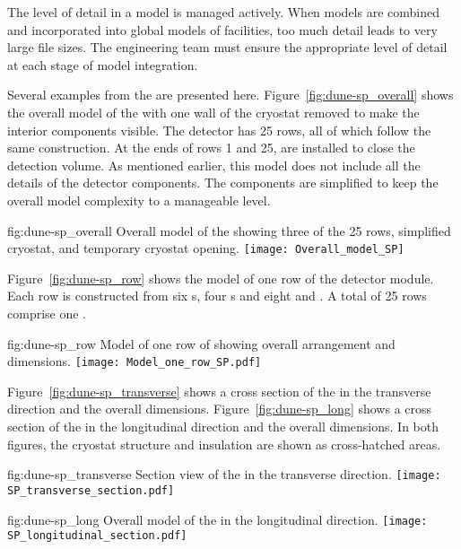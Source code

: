 The level of detail in a model is managed actively. When models are
combined and incorporated into global models of facilities, too much
detail leads to very large file sizes.  The  
engineering team must ensure the appropriate level of detail at each
stage of model integration.


Several examples from the  are presented
here. Figure~\ref{fig:dune-sp_overall} shows the overall model of the
 with one wall of the cryostat removed to make the
interior components visible. The detector has 25 rows, all of which
follow the same construction. At the ends of rows 1 and 25,
 are installed to close the detection volume.  As mentioned
earlier, this model does not include all the details of the detector
components. The components are simplified to keep the overall model
complexity to a manageable level.
\begin{dunefigure}{fig:dune-sp_overall}
  {Overall model of the  showing three of the 25 rows,
    simplified cryostat,  and temporary cryostat opening.}
  \texttt{[image: Overall\_model\_SP]}
\end{dunefigure} 


Figure~\ref{fig:dune-sp_row} shows the model of one row of the
detector module. Each row is constructed from six s, four
s and eight  and . A total of 25 rows
comprise one .
\begin{dunefigure}{fig:dune-sp_row}
  {Model of one row of  showing overall arrangement and dimensions.}
  \texttt{[image: Model\_one\_row\_SP.pdf]}
\end{dunefigure}


Figure~\ref{fig:dune-sp_transverse} shows a cross section of the
 in the transverse direction and the overall dimensions.
Figure~\ref{fig:dune-sp_long} shows a cross section of the
 in the longitudinal direction and the overall
dimensions. In both figures, the cryostat structure and insulation are
shown as cross-hatched areas.
\begin{dunefigure}{fig:dune-sp_transverse}
  {Section view of the  in the transverse
    direction.}
  \texttt{[image: SP\_transverse\_section.pdf]}
\end{dunefigure}
\begin{dunefigure}{fig:dune-sp_long}
  {Overall model of the  in the longitudinal direction.}
  \texttt{[image: SP\_longitudinal\_section.pdf]}
\end{dunefigure}



